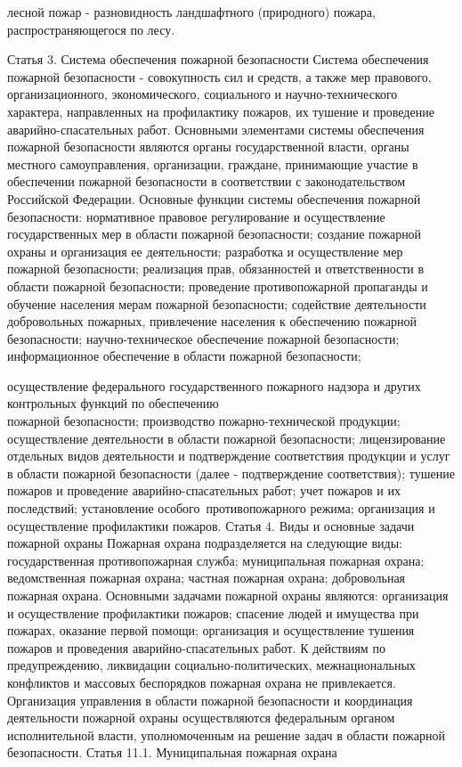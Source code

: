 \documentclass[a4paper, 12pt]{article}
\theoremstyle{definition}
\begin{document}
        лесной пожар - разновидность ландшафтного (природного) пожара,\\ распространяющегося по лесу.

        Статья 3. Система обеспечения пожарной безопасности
        Система обеспечения пожарной безопасности - совокупность сил и средств, а также мер правового, организационного, экономического, социального и научно-технического характера, направленных на профилактику пожаров, их тушение и проведение аварийно-спасательных работ.
        Основными элементами системы обеспечения пожарной безопасности являются органы государственной власти, органы местного самоуправления, организации, граждане, принимающие участие в обеспечении пожарной безопасности в соответствии с законодательством Российской Федерации.
        Основные функции системы обеспечения пожарной безопасности: нормативное правовое регулирование и осуществление государственных мер в области пожарной безопасности;
        создание пожарной охраны и организация ее деятельности;
        разработка и осуществление мер пожарной безопасности;
        реализация прав, обязанностей и ответственности в области пожарной безопасности;
        проведение противопожарной пропаганды и обучение населения мерам пожарной безопасности;
        содействие деятельности добровольных пожарных, привлечение населения к обеспечению пожарной безопасности; 
        научно-техническое обеспечение пожарной безопасности;
        информационное обеспечение в области пожарной безопасности;

        осуществление федерального государственного пожарного надзора и других контрольных функций по обеспечению \\пожарной безопасности;
        производство пожарно-технической продукции;
        осуществление деятельности в области пожарной безопасности;
        лицензирование отдельных видов деятельности и подтверждение соответствия продукции и услуг в области пожарной безопасности (далее - подтверждение соответствия);
        тушение пожаров и проведение аварийно-спасательных работ;
        учет пожаров и их последствий;
        установление особого противопожарного режима;
        организация и осуществление профилактики пожаров.
        Статья 4. Виды и основные задачи пожарной охраны
        Пожарная охрана подразделяется на следующие виды:
        государственная противопожарная служба;
        муниципальная пожарная охрана;
        ведомственная пожарная охрана;
        частная пожарная охрана;
        добровольная пожарная охрана.
        Основными задачами пожарной охраны являются:
        организация и осуществление профилактики пожаров;
        спасение людей и имущества при пожарах, оказание первой помощи;
        организация и осуществление тушения пожаров и проведения аварийно-спасательных работ.
        К действиям по предупреждению, ликвидации социально-политических, межнациональных конфликтов и массовых беспорядков пожарная охрана не привлекается.
        Организация управления в области пожарной безопасности и координация деятельности пожарной охраны осуществляются федеральным органом исполнительной власти, уполномоченным на решение задач в области пожарной безопасности.
        Статья 11.1. Муниципальная пожарная охрана
\end{document}
